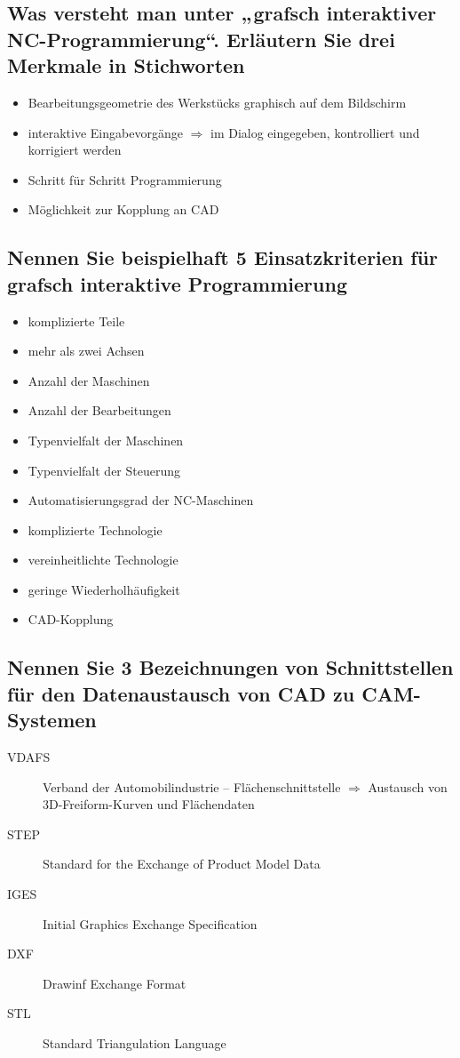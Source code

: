 \subsection*{%
    Was versteht man unter „grafsch interaktiver NC-Programmierung“. Erläutern
    Sie drei Merkmale in Stichworten
}

\begin{itemize}
    \item Bearbeitungsgeometrie des Werkstücks graphisch auf dem Bildschirm
    \item
        interaktive Eingabevorgänge $\Rightarrow$ im Dialog eingegeben,
        kontrolliert und korrigiert werden
    \item Schritt für Schritt Programmierung
    \item Möglichkeit zur Kopplung an CAD
\end{itemize}

\subsection*{%
    Nennen Sie beispielhaft 5 Einsatzkriterien für grafsch interaktive
    Programmierung
}

\begin{itemize}
    \item komplizierte Teile 
    \item mehr als zwei Achsen 
    \item Anzahl der Maschinen 
    \item Anzahl der Bearbeitungen 
    \item Typenvielfalt der Maschinen 
    \item Typenvielfalt der Steuerung 
    \item Automatisierungsgrad der NC-Maschinen 
    \item komplizierte Technologie
    \item vereinheitlichte Technologie 
    \item geringe Wiederholhäufigkeit 
    \item CAD-Kopplung
\end{itemize}

\subsection*{%
    Nennen Sie 3 Bezeichnungen von Schnittstellen für den Datenaustausch von
    CAD zu CAM-Systemen
}

\begin{description}
    \item[VDAFS]
        Verband der Automobilindustrie – Flächenschnittstelle $\Rightarrow$
        Austausch von 3D-Freiform-Kurven und Flächendaten 
    \item[STEP] Standard for the Exchange of Product Model Data 
    \item[IGES] Initial Graphics Exchange Specification 
    \item[DXF] Drawinf Exchange Format 
    \item[STL] Standard Triangulation Language 
\end{description}

